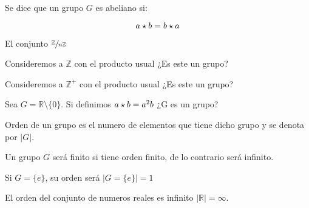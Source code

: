         \begin{definicion}
            Se dice que un grupo $G$ es abeliano si:

            \begin{equation}
                a \star b = b \star a
            \end{equation}
        \end{definicion}

        \begin{ejemplo}
            El conjunto $\sfrac{\mathbb{Z}}{n\mathbb{Z}}$
        \end{ejemplo} 

        \begin{ejercicio}
            Consideremos a $\mathbb{Z}$ con el producto usual ¿Es este un grupo?
        \end{ejercicio}

        \begin{ejercicio}
            Consideremos a $\mathbb{Z}^+$ con el producto usual ¿Es este un grupo?
        \end{ejercicio}

        \begin{ejercicio}
            Sea $G = \mathbb{R} \setminus \{0\}$. Si definimos $a \star b = a^2 b$ ¿G es un grupo?
        \end{ejercicio}

        \begin{definicion}
            Orden de un grupo es el numero de elementos que tiene dicho grupo y se denota por $|G|$.

            Un grupo $G$ será finito si tiene orden finito, de lo contrario será infinito.
        \end{definicion}

        \begin{ejemplo}
            Si $G = \{e\}$, su orden será $\left| G = \{e\} \right| = 1$
        \end{ejemplo}

        \begin{ejemplo}
            El orden del conjunto de numeros reales es infinito $\left| \mathbb{R} \right| = \infty$.
        \end{ejemplo}

